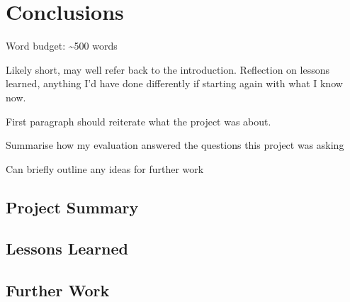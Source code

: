 \documentclass[00-main.tex]{subfiles}
\begin{document}
\chapter{Conclusions}

\begin{Comment}
Word budget: \textasciitilde 500 words
\end{Comment}

\begin{Comment}
Likely short, may well refer back to the introduction. Reflection on lessons learned, anything I'd have done differently if starting again with what I know now.

First paragraph should reiterate what the project was about.

Summarise how my evaluation answered the questions this project was asking

Can briefly outline any ideas for further work
\end{Comment}

\section{Project Summary}

\section{Lessons Learned}

\section{Further Work}
\end{document}
